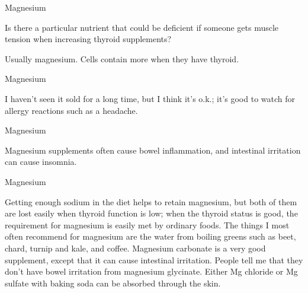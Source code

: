 \documentclass[11pt,oneside,openany,extrafontsizes]{memoir}
\begin{document}
\begin{qaexchange}{Magnesium}

    \begin{question}
        Is there a particular nutrient that could be deficient if someone gets muscle tension when increasing thyroid supplements?
    \end{question}

    \begin{answer}
      Usually magnesium. Cells contain more when they have thyroid.
    \end{answer}
\end{qaexchange}

\begin{standalonequote}{Magnesium}

    \begin{answer}
      I haven't seen it sold for a long time, but I think it's o.k.; it's good to watch for allergy reactions such as a headache.
    \end{answer}
\end{standalonequote}

\begin{standalonequote}{Magnesium}

    \begin{answer}
      Magnesium supplements often cause bowel inflammation, and intestinal irritation can cause insomnia.
    \end{answer}
\end{standalonequote}

\begin{standalonequote}{Magnesium}

    \begin{answer}
      Getting enough sodium in the diet helps to retain magnesium, but both of them are lost easily when thyroid function is low; when the thyroid status is good, the requirement for magnesium is easily met by ordinary foods. The things I most often recommend for magnesium are the water from boiling greens such as beet, chard, turnip and kale, and coffee. Magnesium carbonate is a very good supplement, except that it can cause intestinal irritation. People tell me that they don't have bowel irritation from magnesium glycinate. Either Mg chloride or Mg sulfate with baking soda can be absorbed through the skin.
    \end{answer}
\end{standalonequote}
\end{document}
